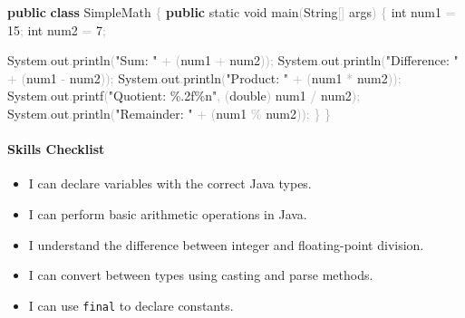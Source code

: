 \documentclass[
  justified,
  openright,
]{tufte-book}
\let\subsection\paragraph
\let\paragraph\paragraph
\newcommand{\KeywordTok}[1]{\textcolor{CodeKeyword}{\textbf{#1}}}  %
\newcommand{\StringTok}[1]{\textcolor{CodeString}{#1}}              %
\newcommand{\CodeNumTok}[1]{\textcolor{CodeNumber}{#1}}             %
\newcommand{\CodeFuncTok}[1]{\textcolor{CodeKeyword}{#1}}           %
\newcommand{\CodeTypeTok}[1]{\textcolor{CodeType}{#1}}              %
\newcommand{\OperatorTok}[1]{\textcolor{DarkGray}{#1}}              %
\newenvironment{Shaded}{%
  \begin{mdframed}[style=TufteCode]%
}{%
  \end{mdframed}%
}
\let\subsection\paragraph
\let\paragraph\paragraph
\providecommand{\tightlist}{%
  \setlength{\itemsep}{0pt}\setlength{\parskip}{0pt}}
\begin{document}
\begin{Shaded}
\begin{Highlighting}[]
\KeywordTok{public} \KeywordTok{class} SimpleMath \OperatorTok{\{}
    \KeywordTok{public} \CodeTypeTok{static} \CodeTypeTok{void} \CodeFuncTok{main}\OperatorTok{(}String\OperatorTok{[]} args\OperatorTok{)} \OperatorTok{\{}
        \CodeTypeTok{int} num1 \OperatorTok{=} \CodeNumTok{15}\OperatorTok{;}
        \CodeTypeTok{int} num2 \OperatorTok{=} \CodeNumTok{7}\OperatorTok{;}
 
        System\OperatorTok{.}\CodeFuncTok{out}\OperatorTok{.}\CodeFuncTok{println}\OperatorTok{(}\StringTok{"Sum: "} \OperatorTok{+} \OperatorTok{(}num1 \OperatorTok{+} num2\OperatorTok{));}
        System\OperatorTok{.}\CodeFuncTok{out}\OperatorTok{.}\CodeFuncTok{println}\OperatorTok{(}\StringTok{"Difference: "} \OperatorTok{+} \OperatorTok{(}num1 \OperatorTok{{-}} num2\OperatorTok{));}
        System\OperatorTok{.}\CodeFuncTok{out}\OperatorTok{.}\CodeFuncTok{println}\OperatorTok{(}\StringTok{"Product: "} \OperatorTok{+} \OperatorTok{(}num1 \OperatorTok{*} num2\OperatorTok{));}
        System\OperatorTok{.}\CodeFuncTok{out}\OperatorTok{.}\CodeFuncTok{printf}\OperatorTok{(}\StringTok{"Quotient: }\StringTok{\%.2f\%n}\StringTok{"}\OperatorTok{,} \OperatorTok{(}\CodeTypeTok{double}\OperatorTok{)} num1 \OperatorTok{/} num2\OperatorTok{);}
        System\OperatorTok{.}\CodeFuncTok{out}\OperatorTok{.}\CodeFuncTok{println}\OperatorTok{(}\StringTok{"Remainder: "} \OperatorTok{+} \OperatorTok{(}num1 \OperatorTok{\%} num2\OperatorTok{));}
    \OperatorTok{\}}
\OperatorTok{\}}
\end{Highlighting}
\end{Shaded}

\subsection{Skills Checklist}\label{skills-checklist-71}

\begin{itemize}
\tightlist
\item[$\square$]
  I can declare variables with the correct Java types.
\item[$\square$]
  I can perform basic arithmetic operations in Java.
\item[$\square$]
  I understand the difference between integer and floating-point
  division.
\item[$\square$]
  I can convert between types using casting and parse methods.
\item[$\square$]
  I can use \texttt{final} to declare constants.
\end{itemize}
\end{document}
